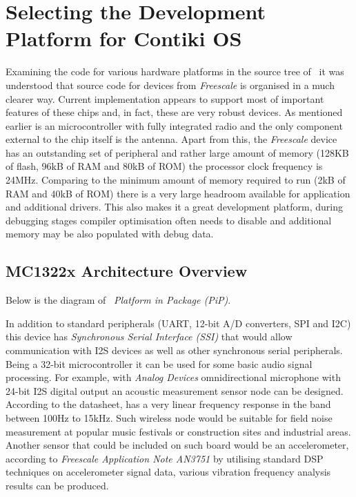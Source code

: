\section{Selecting the Development Platform for Contiki OS}

  Examining the code for various hardware platforms in the source
 tree of \ContikiOS\, it was understood that source code for
  devices from \emph{Freescale} is organised in a
 much clearer way. Current implementation appears to support most
 of important features of these chips and, in fact, these are
 very robust devices. As mentioned earlier  is an
  microcontroller with fully integrated radio and
 the only component external to the chip itself is the antenna.
 Apart from this, the \emph{Freescale} device has an outstanding
 set of peripheral and rather large amount of memory (128KB of
 flash, 96kB of RAM and 80kB of ROM) the processor clock frequency
 is 24MHz. Comparing to the minimum amount of memory required
 to run \Contiki (2kB of RAM and 40kB of ROM) there is a very
 large headroom available for application and additional drivers.
 This also makes it a great development platform, during debugging
 stages compiler optimisation often needs to disable and additional
 memory may be also populated with debug data.

\subsection{MC1322x Architecture Overview}

 Below is the diagram of \MCX\ \emph{Platform in Package (PiP)}.

  In addition to standard peripherals (UART, 12-bit A/D converters,
 SPI and I2C) this device has \emph{Synchronous Serial Interface (SSI)}
 that would allow communication with I2S devices as well as other
 synchronous serial peripherals. Being a 32-bit microcontroller
 it can be used for some basic audio signal processing. For example,
 with \emph{Analog Devices}  omnidirectional microphone
 with 24-bit I2S digital output \cite{datasheet:adi:ADMP441} an
 acoustic measurement sensor node can be designed. According to the
 datasheet,  has a very linear frequency response in
 the band between 100Hz to 15kHz. Such wireless node would be
 suitable for field noise measurement at popular music festivals
 or construction sites and industrial areas.
 Another sensor that could be included on such board would be an
 accelerometer, according to \emph{Freescale Application
 Note AN3751} \cite{appnote:freescale:AN3751} by utilising standard
 DSP techniques on accelerometer signal data, various vibration
 frequency analysis results can be produced.

